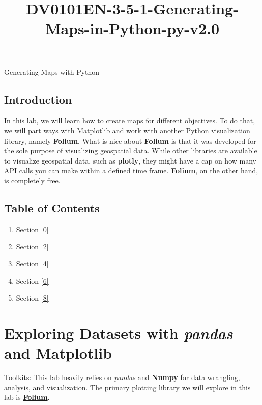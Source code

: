\documentclass[11pt]{article}
\title{DV0101EN-3-5-1-Generating-Maps-in-Python-py-v2.0}
\providecommand{\tightlist}{%
      \setlength{\itemsep}{0pt}\setlength{\parskip}{0pt}}
\begin{document}
    
    \maketitle
    
    

    
    Generating Maps with Python

    \hypertarget{introduction}{%
\subsection{Introduction}\label{introduction}}

In this lab, we will learn how to create maps for different objectives.
To do that, we will part ways with Matplotlib and work with another
Python visualization library, namely \textbf{Folium}. What is nice about
\textbf{Folium} is that it was developed for the sole purpose of
visualizing geospatial data. While other libraries are available to
visualize geospatial data, such as \textbf{plotly}, they might have a
cap on how many API calls you can make within a defined time frame.
\textbf{Folium}, on the other hand, is completely free.

    \hypertarget{table-of-contents}{%
\subsection{Table of Contents}\label{table-of-contents}}

\begin{enumerate}
\def\labelenumi{\arabic{enumi}.}
\tightlist
\item
  Section \ref{0}
\item
  Section \ref{2}
\item
  Section \ref{4}
\item
  Section \ref{6}
\item
  Section \ref{8}
\end{enumerate}

    \hypertarget{exploring-datasets-with-pandas-and-matplotlib}{%
\section{\texorpdfstring{Exploring Datasets with \emph{pandas} and
Matplotlib}{Exploring Datasets with pandas and Matplotlib}}\label{exploring-datasets-with-pandas-and-matplotlib}}

Toolkits: This lab heavily relies on
\href{http://pandas.pydata.org/}{\emph{pandas}} and
\href{http://www.numpy.org/}{\textbf{Numpy}} for data wrangling,
analysis, and visualization. The primary plotting library we will
explore in this lab is
\href{https://github.com/python-visualization/folium/}{\textbf{Folium}}.
\end{document}
